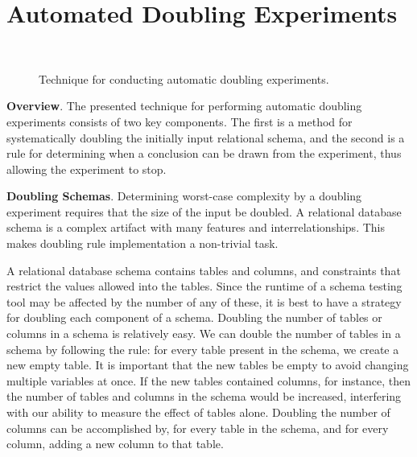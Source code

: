 
\vspace*{-.035in}
\section{Automated Doubling Experiments}\label{sec:technique}
\vspace*{-.035in}

  \begin{figure*}
    
    \vspace*{-.1in}
    \caption{Technique for conducting automatic doubling experiments.}~\label{fig:doublingexp}
    \vspace*{-.1in}
  \end{figure*}


  {\bf Overview}. The presented technique for performing automatic doubling experiments consists of two key components.
  The first is a method for systematically doubling the initially input relational schema, and the second is a rule for
  determining when a conclusion can be drawn from the experiment, thus allowing the experiment to stop.

  \textbf{Doubling Schemas}. Determining worst-case complexity by a doubling experiment requires that the size of the
  input be doubled. A relational database schema is a complex artifact with many features and interrelationships.  This
  makes doubling rule implementation a non-trivial task.


  A relational database schema contains tables and columns, and constraints that restrict the values allowed into the
  tables. Since the runtime of a schema testing tool may be affected by the number of any of these, it is best to have a
  strategy for doubling each component of a schema. Doubling the number of tables or columns in a schema is relatively
  easy.  We can double the number of tables in a schema by following the rule: for every table present in the schema, we
  create a new empty table. It is important that the new tables be empty to avoid changing multiple variables at once.
  If the new tables contained columns, for instance, then the number of tables and columns in the schema would be
  increased, interfering with our ability to measure the effect of tables alone.  Doubling the number of columns can be
  accomplished by, for every table in the schema, and for every column, adding a new column to that table.

